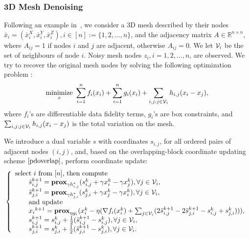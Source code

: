 \subsubsection{3D Mesh Denoising}
Following an example in~\cite{repetti2015random}, we consider a 3D mesh described by their nodes $\bar{x}_i=(\bar{x}_i^X,\bar{x}_i^Y,\bar{x}_i^Z), i\in[n] := \{1,2,...,n\}$, and the adjacency matrix $A\in\mathbb{R}^{n\times n}$, where $A_{ij} = 1$ if nodes $i$ and $j$ are adjacent, otherwise $A_{ij} = 0$. We let ${\mathcal{V}}_i$  be the set of neighbours of node $i$. Noisy mesh nodes $z_i, i=1,2,...,n$, are observed. We try to recover the original mesh nodes by solving the following optimization problem \cite{repetti2015random}:
\begin{equation}
\Min_{x} ~\sum_{i=1}^n f_i(x_i)+\sum_{i=1}^n g_i(x_i)+\sum_{i,j:j\in \cV_{i}} h_{i,j}(x_{i}-x_{j}),
\end{equation}
where $f_i$'s are differentiable data fidelity terms, $g_i$'s are box constraints, and $\sum_{i,j:j\in {\mathcal{V}}_{i}} h_{i,j}(x_{i}-x_{j})$ is the total variation on the mesh.

We introduce a dual variable $s$ with coordinates $s_{i,j}$, for all ordered pairs of adjacent nodes $(i,j)$, and, based on the overlapping-block coordinate updating scheme $\eqref{pdoverlap}$, perform coordinate update:
\begin{equation}
\left\{
\begin{array}{l}
\text{select $i$ from $[n]$, then compute }\\
\qquad \tilde{s}_{i,j}^{k+1}=\prox_{\gamma h_{i,j}^*} (s_{i,j}^k+\gamma x_i^k-\gamma x_j^k),\forall j\in\cV_i,\\
\qquad \tilde{s}_{j,i}^{k+1}=\prox_{\gamma h_{j,i}^*} (s_{j,i}^k+\gamma x_j^k-\gamma x_i^k),\forall j\in\cV_i,\\
\qquad \textnormal{and update}\\
\qquad {x_i}^{k+1}=\prox_{\eta g_i}(x_i^k-\eta(\nabla f_i(x_i^k)+\sum_{j\in\cV_i}(2\tilde{s}_{i,j}^{k+1}-2\tilde{s}_{j,i}^{k+1}-s_{i,j}^k+{s}_{j,i}^{k}))),\\
\qquad s_{i,j}^{k+1}=s_{i,j}^k+\frac{1}{2}(\tilde{s}_{i,j}^{k+1}-s_{i,j}^k),\forall j\in\cV_i,\\
\qquad s_{j,i}^{k+1}=s_{j,i}^k+\frac{1}{2}(\tilde{s}_{j,i}^{k+1}-s_{j,i}^k),\forall j\in\cV_i.
\end{array}
\right.\nonumber
\end{equation}
